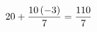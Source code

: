\documentclass[preview]{standalone}
\begin{document}
\begin{align*}
\special{dvisvgm:raw <g id='unique000'>}20 + \frac{10 \left(-3\right)}{7} = \frac{110}{7}\special{dvisvgm:raw </g>}
\end{align*}
\end{document}
